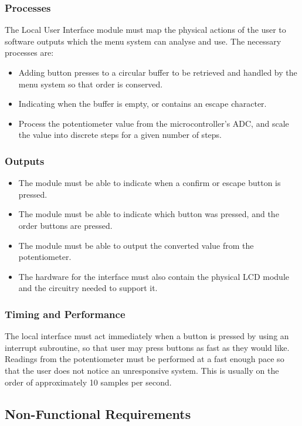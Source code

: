 \documentclass[]{report}
\begin{document}
\subsubsection{Processes}
The Local User Interface module must map the physical actions of the user to software outputs which the menu system can analyse and use. The necessary processes are:

\begin{itemize}
	\item Adding button presses to a circular buffer to be retrieved and handled by the menu system so that order is conserved.
	\item Indicating when the buffer is empty, or contains an escape character.
	\item Process the potentiometer value from the microcontroller's ADC, and scale the value into discrete steps for a given number of steps.
\end{itemize}
\subsubsection{Outputs}
\begin{itemize}
	\item The module must be able to indicate when a confirm or escape button is pressed.
	\item The module must be able to indicate which button was pressed, and the order buttons are pressed.
	\item The module must be able to output the converted value from the potentiometer.
	\item The hardware for the interface must also contain the physical LCD module and the circuitry needed to support it.
\end{itemize}
\subsubsection{Timing and Performance}
The local interface must act immediately when a button is pressed by using an interrupt subroutine, so that user may press buttons as fast as they would like. Readings from the potentiometer must be performed at a fast enough pace so that the user does not notice an unresponsive system. This is usually on the order of approximately 10 samples per second.

\subsection{Non-Functional Requirements}
\end{document}
